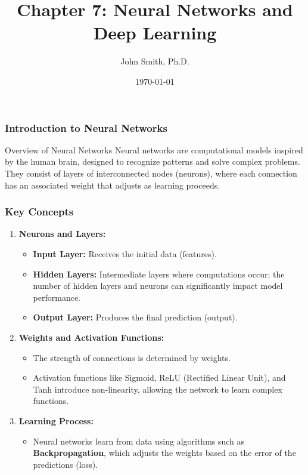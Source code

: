 \documentclass[aspectratio=169]{beamer}
\title[Neural Networks and Deep Learning]{Chapter 7: Neural Networks and Deep Learning}
\author[J. Smith]{John Smith, Ph.D.}
\institute[University Name]{
  Department of Computer Science\\
  University Name\\
  \vspace{0.3cm}
  Email: email@university.edu\\
  Website: www.university.edu
}
\date{\today}
\begin{document}
\frame{\titlepage}

\begin{frame}[fragile]
    \frametitle{Introduction to Neural Networks}
    \begin{block}{Overview of Neural Networks}
        Neural networks are computational models inspired by the human brain, designed to recognize patterns and solve complex problems. They consist of layers of interconnected nodes (neurons), where each connection has an associated weight that adjusts as learning proceeds.
    \end{block}
\end{frame}

\begin{frame}[fragile]
    \frametitle{Key Concepts}
    \begin{enumerate}
        \item \textbf{Neurons and Layers:}
            \begin{itemize}
                \item \textbf{Input Layer:} Receives the initial data (features).
                \item \textbf{Hidden Layers:} Intermediate layers where computations occur; the number of hidden layers and neurons can significantly impact model performance.
                \item \textbf{Output Layer:} Produces the final prediction (output).
            \end{itemize}

        \item \textbf{Weights and Activation Functions:}
            \begin{itemize}
                \item The strength of connections is determined by weights.
                \item Activation functions like Sigmoid, ReLU (Rectified Linear Unit), and Tanh introduce non-linearity, allowing the network to learn complex functions.
            \end{itemize}

        \item \textbf{Learning Process:}
            \begin{itemize}
                \item Neural networks learn from data using algorithms such as \textbf{Backpropagation}, which adjusts the weights based on the error of the predictions (loss).
            \end{itemize}
    \end{enumerate}
\end{frame}
\end{document}
